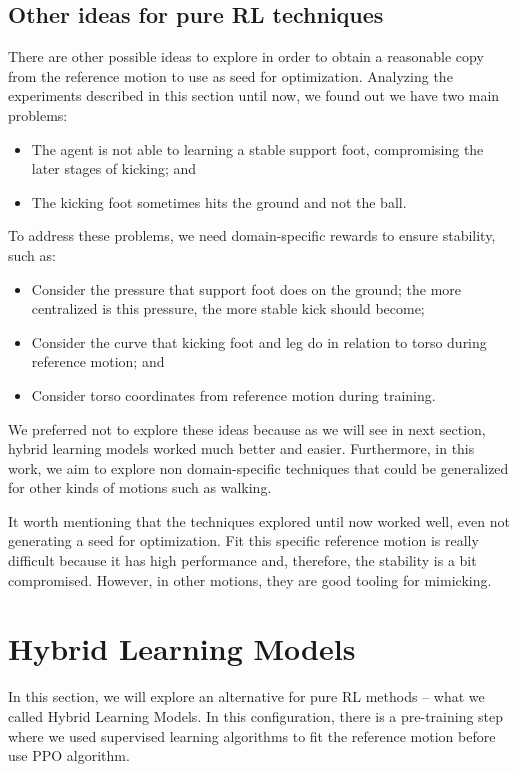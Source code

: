 \subsection{Other ideas for pure RL techniques}

There are other possible ideas to explore in order to obtain a reasonable copy from the reference motion to use as seed for optimization. Analyzing the experiments described in this section until now, we found out we have two main problems:

\begin{itemize}
	\item The agent is not able to learning a stable support foot, compromising the later stages of kicking; and
	\item The kicking foot sometimes hits the ground and not the ball.
\end{itemize}

To address these problems, we need domain-specific rewards to ensure stability, such as:

\begin{itemize}
	\item Consider the pressure that support foot does on the ground; the more centralized is this pressure, the more stable kick should become;
	\item Consider the curve that kicking foot and leg do in relation to torso during reference motion; and
	\item Consider torso coordinates from reference motion during training.
\end{itemize}

We preferred not to explore these ideas because as we will see in next section, hybrid learning models worked much better and easier. Furthermore, in this work, we aim to explore non domain-specific techniques that could be generalized for other kinds of motions such as walking.

It worth mentioning that the techniques explored until now worked well, even not generating a seed for optimization. Fit this specific reference motion is really difficult because it has high performance and, therefore, the stability is a bit compromised. However, in other motions, they are good tooling for mimicking.

\section{Hybrid Learning Models}
In this section, we will explore an alternative for pure RL methods -- what we called Hybrid Learning Models. In this configuration, there is a pre-training step where we used supervised learning algorithms to fit the reference motion before use PPO algorithm.

